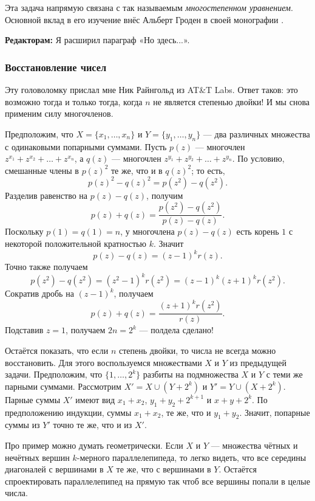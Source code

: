 Эта задача напрямую связана с так называемым \emph{многостепенном уравнением}.
Основной вклад в его изучение внёс Альберт Гроден в своей монографии \cite{gloden}.


\begin{addedbytheeditors}
\textbf{Редакторам:} Я расширил параграф «Но здесь...».
\end{addedbytheeditors}

\subsubsection*{Восстановление чисел}

Эту головоломку прислал мне Ник Райнгольд из AT\&T Labs.
Ответ таков: это возможно тогда и только тогда, когда $n$ не является степенью двойки!
И мы снова применим силу многочленов.

Предположим, что $X = \{x_1 , \dots , x_n\}$ и $Y = \{y_1 , \dots , y_n\}$ --- два различных множества с одинаковыми попарными суммами.
Пусть $p(z)$ --- многочлен $z^{x_1} + z^{x_2} + \dots + z^{x_n}$,
а $q(z)$ --- многочлен $z^{y_1} + z^{y_2} + \dots + z^{y_n}$.
По условию, смешанные члены в $p(z)^2$ те же, что и в $q(z)^2$;
то есть,
\[p(z)^2 -q(z)^2 = p(z^2 )-q(z^2).\]
Разделив равенство на $p(z) - q(z)$, получим
\[p(z) + q(z) =
\frac{p(z^2 ) - q(z^2 )}{p(z) - q(z)}.
\]
Поскольку $p(1) = q(1) = n$,
у многочлена $p(z) - q(z)$ есть корень $1$ с некоторой положительной кратностью $k$.
Значит
\[p(z) - q(z) = (z - 1)^k r(z).\]
Точно также получаем
\[p(z^2 ) - q(z^2 ) = (z^2 - 1)^k r(z^2 )= (z - 1)^k (z + 1)^k r(z^2).\]
Сократив дробь на $(z - 1)^k$, получаем
\[p(z) + q(z) =
\frac{(z + 1)^k r(z^2)}{r(z)}.
\]
Подставив $z = 1$, получаем $2n = 2^k$ --- полдела сделано!

Остаётся показать, что если $n$ степень двойки, то
числа не всегда можно восстановить.
Для этого воспользуемся множествами $X$ и $Y$ из предыдущей задачи.
Предположим, что $\{1, \dots , 2^k\}$ разбиты на подмножества $X$ и $Y$ с теми же парными суммами.
Рассмотрим $X' = X \cup (Y + 2^k)$ и $Y' = Y \cup (X + 2^k)$.
Парные суммы $X'$ имеют вид $x_1 + x_2$, $y_1 + y_2 + 2^{k+1}$ и $x + y + 2^k$.
По предположению индукции,
суммы $x_1 + x_2$, те же, что и $y_1 + y_2$.
Значит, попарные суммы из $Y'$ точно те же, что и из $X'$.

\begin{addedbytheeditors}
Про пример можно думать геометрически.
Если $X$ и $Y$ --- множества чётных и нечётных вершин $k$-мерного параллелепипеда, то легко видеть, что все середины диагоналей с вершинами в $X$ те же, что с вершинами в $Y$.
Остаётся спроектировать параллелепипед на прямую так чтоб все вершины попали в целые числа.
\end{addedbytheeditors}

